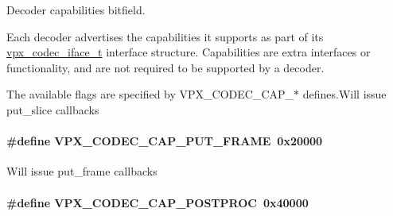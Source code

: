 Decoder capabilities bitfield. 

Each decoder advertises the capabilities it supports as part of its \hyperlink{group__codec_gae99c3b04f4a567a311211cce3ae6b83b}{vpx\+\_\+codec\+\_\+iface\+\_\+t} interface structure. Capabilities are extra interfaces or functionality, and are not required to be supported by a decoder.

The available flags are specified by V\+P\+X\+\_\+\+C\+O\+D\+E\+C\+\_\+\+C\+A\+P\+\_\+$\ast$ defines.\+Will issue put\+\_\+slice callbacks \hypertarget{group__decoder_ga0ef59ca8067ac1dc8c8378042277ccc8}{
\paragraph[{V\+P\+X\+\_\+\+C\+O\+D\+E\+C\+\_\+\+C\+A\+P\+\_\+\+P\+U\+T\+\_\+\+F\+R\+A\+M\+E}]{\setlength{\rightskip}{0pt plus 5cm}\#define V\+P\+X\+\_\+\+C\+O\+D\+E\+C\+\_\+\+C\+A\+P\+\_\+\+P\+U\+T\+\_\+\+F\+R\+A\+M\+E~0x20000}}\label{group__decoder_ga0ef59ca8067ac1dc8c8378042277ccc8}
Will issue put\+\_\+frame callbacks \hypertarget{group__decoder_ga7825ade982ab85a5583d3d8a669baa3b}{
\paragraph[{V\+P\+X\+\_\+\+C\+O\+D\+E\+C\+\_\+\+C\+A\+P\+\_\+\+P\+O\+S\+T\+P\+R\+O\+C}]{\setlength{\rightskip}{0pt plus 5cm}\#define V\+P\+X\+\_\+\+C\+O\+D\+E\+C\+\_\+\+C\+A\+P\+\_\+\+P\+O\+S\+T\+P\+R\+O\+C~0x40000}}\label{group__decoder_ga7825ade982ab85a5583d3d8a669baa3b}
